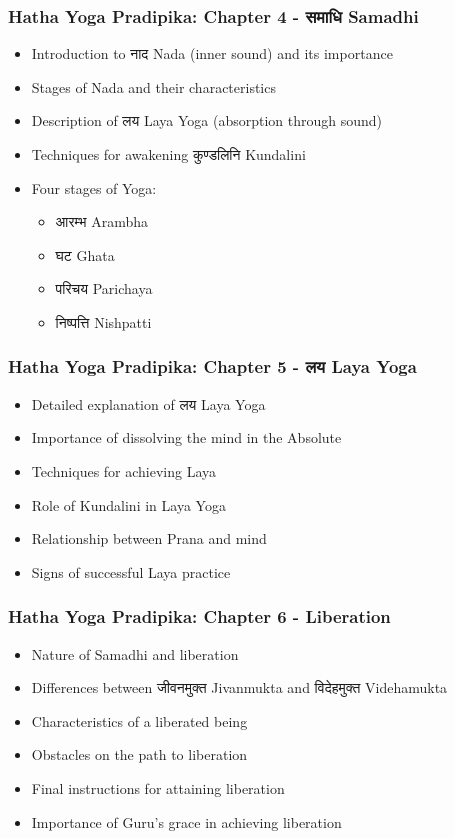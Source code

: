 \begin{frame}[fragile]\frametitle{Hatha Yoga Pradipika: Chapter 4 - समाधि  Samadhi}
\begin{itemize}
    \item Introduction to नाद  Nada (inner sound) and its importance
    \item Stages of Nada and their characteristics
    \item Description of लय  Laya Yoga (absorption through sound)
    \item Techniques for awakening कुण्डलिनि  Kundalini
    \item Four stages of Yoga:
    \begin{itemize}
        \item आरम्भ  Arambha
        \item घट Ghata
        \item परिचय Parichaya
        \item निष्पत्ति Nishpatti
    \end{itemize}
\end{itemize}
\end{frame}

\begin{frame}[fragile]\frametitle{Hatha Yoga Pradipika: Chapter 5 - लय  Laya Yoga}
\begin{itemize}
    \item Detailed explanation of लय  Laya Yoga
    \item Importance of dissolving the mind in the Absolute
    \item Techniques for achieving Laya
    \item Role of Kundalini in Laya Yoga
    \item Relationship between Prana and mind
    \item Signs of successful Laya practice
\end{itemize}
\end{frame}

\begin{frame}[fragile]\frametitle{Hatha Yoga Pradipika: Chapter 6 - Liberation}
\begin{itemize}
    \item Nature of Samadhi and liberation
    \item Differences between जीवनमुक्त  Jivanmukta and विदेहमुक्त  Videhamukta
    \item Characteristics of a liberated being
    \item Obstacles on the path to liberation
    \item Final instructions for attaining liberation
    \item Importance of Guru's grace in achieving liberation
\end{itemize}
\end{frame}

